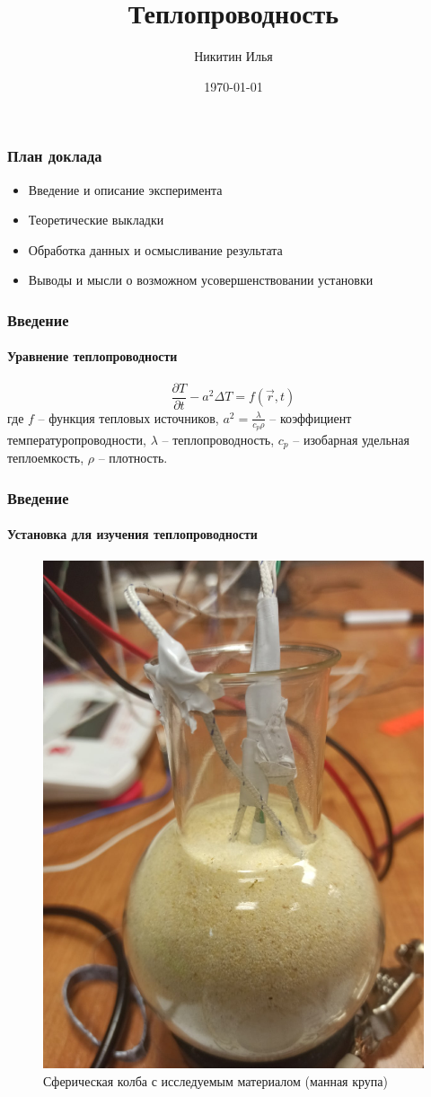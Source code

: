 \documentclass[8pt,pdf,hyperref={unicode}]{beamer}
\title{Теплопроводность}
\author{Никитин Илья}
\date{\today}
\begin{document}
	\maketitle
	
	\begin{frame}
		\frametitle{План доклада}
		\begin{center}
			\begin{itemize}
				\item Введение и описание эксперимента
				\item Теоретические выкладки
				\item Обработка данных и осмысливание результата
				\item Выводы и мысли о возможном усовершенствовании установки
			\end{itemize}
		\end{center}
	\end{frame}
	\begin{frame}
		\frametitle{Введение}
		\framesubtitle{Уравнение теплопроводности}
		\begin{center}
			\begin{equation}
				\frac{\partial T}{\partial t} - a^2 \Delta T = f(\vec{r}, t)
			\end{equation}
			где $f$ -- функция тепловых источников, $a^2 = \frac{\lambda}{c_p \rho}$ -- коэффициент температуропроводности, $\lambda$ -- теплопроводность, $c_p$ -- изобарная удельная теплоемкость, $\rho$ -- плотность.
		\end{center}
	\end{frame}
	\begin{frame}
		\frametitle{Введение}
		\framesubtitle{Установка для изучения теплопроводности}
		\begin{center}
			\begin{figure}[h!]
				\centering
				\includegraphics[width=.4\linewidth]{1.jpg}
				\caption{Сферическая колба с исследуемым материалом (манная крупа)}
				\label{fig1}
			\end{figure}	
		\end{center}
	\end{frame}
\end{document}

